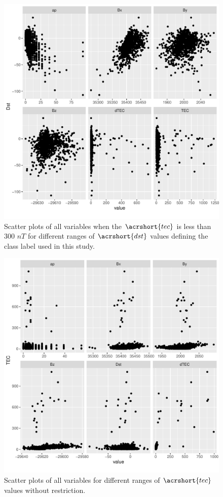 \documentclass[sn-mathphys-num]{sn-jnl}%
\begin{document}
\begin{figure}
    \centering
    \includegraphics[width=0.9\linewidth]{iono3scatterplot.pdf}
    \caption{Scatter plots of all variables when the $\acrshort{tec}$ is less than $300$ $nT$ for different ranges of $\acrshort{dst}$ values defining the class label used in this study.}
    \label{fig:iono3scatterplot}
\end{figure}

\begin{figure}
    \centering
    \includegraphics[width=0.9\linewidth]{dataset2scatterplot.pdf}
    \caption{Scatter plots of all variables for different ranges of $\acrshort{tec}$ values without restriction.}
    \label{fig:dataset2scatterplot}
\end{figure}
\end{document}
